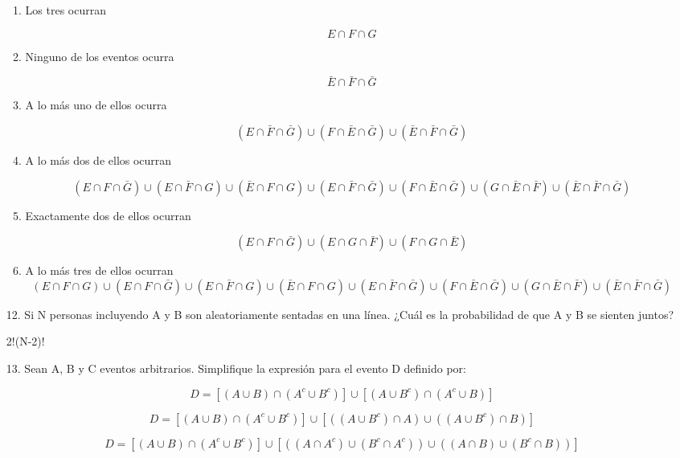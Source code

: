 \documentclass[letterpaper,11pt]{article}
\renewcommand{%
	\contentsname}{\vspace{-1cm} \hfill\bfseries\LARGE Índice \hfill \vspace{0.2cm}%
}
\begin{document}
\begin{enumerate}
\begin{enumerate}
	\item Los tres ocurran 
	
	$$ E \cap F \cap G $$

	\item Ninguno de los eventos ocurra 
	
	$$ \bar{E} \cap \bar{F} \cap \bar{G} $$

	\item A lo más uno de ellos ocurra 
	
	$$
	(E \cap \bar{F} \cap \bar{G}) \cup (F \cap \bar{E} \cap \bar{G}) \cup (\bar{E} \cap \bar{F} \cap \bar{G})
	$$

	\item A lo más dos de ellos ocurran 
	
	$$
	(E \cap F \cap \bar{G}) \cup (E \cap \bar{F} \cap G) \cup (\bar{E} \cap F \cap G) \cup (E \cap \bar{F} \cap \bar{G}) \cup (F \cap \bar{E} \cap \bar{G}) \cup (G \cap \bar{E} \cap \bar{F}) \cup (\bar{E} \cap \bar{F} \cap \bar{G})
	$$

	\item Exactamente dos de ellos ocurran 
	
	$$
	(E \cap F \cap \bar{G}) \cup (E \cap G \cap \bar{F}) \cup (F \cap G \cap \bar{E})
	$$

	\item A lo más tres de ellos ocurran 	
	$$
	(E \cap F \cap G) \cup (E \cap F \cap \bar{G}) \cup (E \cap \bar{F} \cap G) \cup (\bar{E} \cap F \cap G) \cup (E \cap \bar{F} \cap \bar{G}) \cup (F \cap \bar{E} \cap \bar{G}) \cup (G \cap \bar{E} \cap \bar{F}) \cup (\bar{E} \cap \bar{F} \cap \bar{G})
	$$
\end{enumerate}

\item[12.] Si N personas incluyendo A y B son aleatoriamente sentadas en una línea. ¿Cuál es la probabilidad de que A y B se sienten juntos?

2!(N-2)!

\item[13.] Sean A, B y C eventos arbitrarios. Simplifique la expresión para el evento D definido por: 

$$
D= [(A \cup B) \cap (A^c \cup B^c)] \cup [(A \cup B^c) \cap (A^c \cup B)]
$$

$$
D= [(A \cup B) \cap (A^c \cup B^c)] \cup [((A \cup B^c) \cap A ) \cup ((A \cup B^c) \cap B )]
$$

$$
D= [(A \cup B) \cap (A^c \cup B^c)] \cup [((A \cap A^c) \cup (B^c \cap A^c) ) \cup 
((A \cap B) \cup (B^c \cap B) )]
$$


\end{enumerate}
\end{document}
